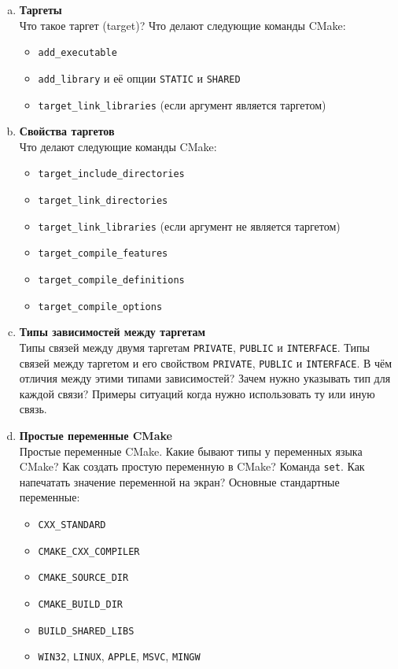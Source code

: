 \documentclass{article}
\begin{document}
\begin{enumerate}
\begin{enumerate}[a.]
\item \textbf{Таргеты}\\
Что такое таргет (target)? Что делают следующие команды CMake:
\begin{itemize}
\item \texttt{add\_executable}
\item \texttt{add\_library} и её опции \texttt{STATIC} и \texttt{SHARED}
\item \texttt{target\_link\_libraries} (если аргумент является таргетом)
\end{itemize}


\item \textbf{Свойства таргетов}\\
Что делают следующие команды CMake:
\begin{itemize}
\item \texttt{target\_include\_directories}
\item \texttt{target\_link\_directories}
\item \texttt{target\_link\_libraries} (если аргумент не является таргетом)
\item \texttt{target\_compile\_features}
\item \texttt{target\_compile\_definitions}
\item \texttt{target\_compile\_options}
\end{itemize}


\item \textbf{Типы зависимостей между таргетам}\\
Типы связей между двумя таргетам \texttt{PRIVATE}, \texttt{PUBLIC} и \texttt{INTERFACE}.
Типы связей между таргетом и его свойством \texttt{PRIVATE}, \texttt{PUBLIC} и \texttt{INTERFACE}.
В чём отличия между этими типами зависимостей? Зачем нужно указывать тип для каждой связи? 
Примеры ситуаций когда нужно использовать ту или иную связь.


\item \textbf{Простые переменные CMake}\\
Простые переменные CMake. Какие бывают типы у переменных языка CMake? Как создать простую переменную в CMake? Команда \texttt{set}. Как напечатать значение переменной на экран? Основные стандартные переменные:
\begin{itemize}
\item \texttt{CXX\_STANDARD}
\item \texttt{CMAKE\_CXX\_COMPILER}
\item \texttt{CMAKE\_SOURCE\_DIR}
\item \texttt{CMAKE\_BUILD\_DIR}
\item \texttt{BUILD\_SHARED\_LIBS}
\item \texttt{WIN32}, \texttt{LINUX}, \texttt{APPLE}, \texttt{MSVC}, \texttt{MINGW}
\end{itemize}


\end{enumerate}
\end{enumerate}
\end{document}
